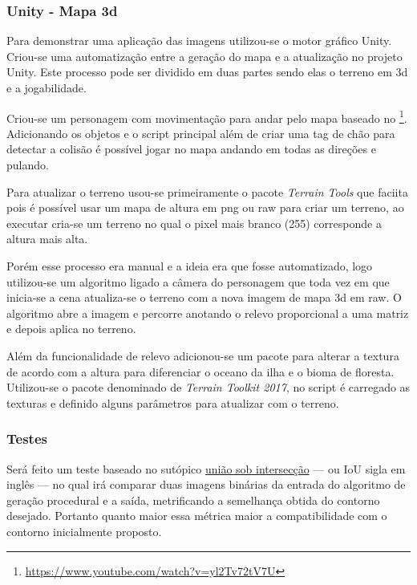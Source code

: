 \subsubsection{Unity - Mapa 3d}

Para demonstrar uma aplicação das imagens utilizou-se o motor gráfico Unity. Criou-se uma automatização entre a geração do mapa e a atualização no projeto Unity. Este processo pode ser dividido em duas partes sendo elas o terreno em 3d e a jogabilidade.


Criou-se um personagem com movimentação para andar pelo mapa baseado no \footnote{\url{https://www.youtube.com/watch?v=yl2Tv72tV7U}}. Adicionando os objetos e o script principal além de criar uma tag de chão para detectar a colisão é possível jogar no mapa andando em todas as direções e pulando.

 Para atualizar o terreno usou-se primeiramente o pacote \textit{Terrain Tools} que faciita pois é possível usar um mapa de altura em png ou raw para criar um terreno, ao executar cria-se um terreno no qual o pixel mais branco (255) corresponde a altura mais alta.

 Porém esse processo era manual e a ideia era que fosse automatizado, logo utilizou-se um algoritmo ligado a câmera do personagem que toda vez em que inicia-se a cena atualiza-se o terreno com a nova imagem de mapa 3d em raw. O algoritmo abre a imagem e percorre anotando o relevo proporcional a uma matriz e depois aplica no terreno.

 Além da funcionalidade de relevo adicionou-se um pacote para alterar a textura de acordo com a altura para diferenciar o oceano da ilha e o bioma de floresta. Utilizou-se o pacote denominado de \textit{Terrain Toolkit 2017}, no script é carregado as texturas e definido alguns parâmetros para atualizar com o terreno.

\subsubsection{Testes}

Será feito um teste baseado no sutópico \hyperref[sec:uniaoSobInterseccao]{união sob intersecção} — ou IoU sigla em inglês — no qual irá comparar duas imagens binárias da entrada do algoritmo de geração procedural e a saída, metrificando a semelhança obtida do contorno desejado. Portanto quanto maior essa métrica maior a compatibilidade com o contorno inicialmente proposto.

